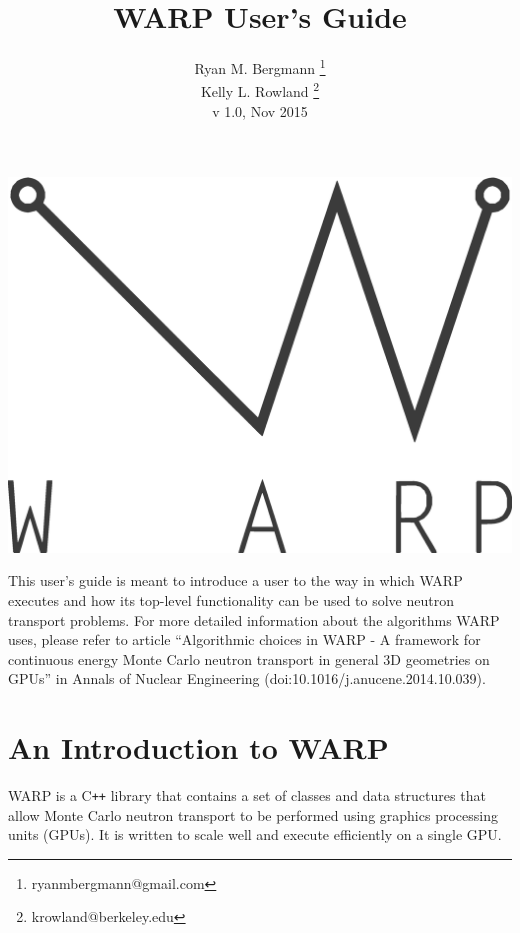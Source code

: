 \documentclass[twoside,a4paper]{refart}
\title{WARP User's Guide}
\author{Ryan M. Bergmann \thanks{ryanmbergmann@gmail.com} \\
Kelly L. Rowland \thanks{krowland@berkeley.edu}\\
v 1.0,  Nov 2015}
\date{}
\begin{document}
\maketitle

%
%

\includegraphics[width=\linewidth]{graphics/warp-vec.eps}

\vspace*{\fill} %

This user's guide is meant to introduce a user to the way in which WARP executes and how its top-level 
functionality can be used to solve neutron transport problems.  For more detailed information about the 
algorithms WARP uses, please refer to article ``Algorithmic choices in WARP - A framework for continuous 
energy Monte Carlo neutron transport in general 3D geometries on GPUs'' in Annals of Nuclear Engineering 
(doi:10.1016/j.anucene.2014.10.039).

\vfill


\newpage
\tableofcontents
\newpage



\section{An Introduction to WARP}

WARP is a C\texttt{++} library that contains a set of classes and data structures that allow Monte Carlo 
neutron transport to be performed using graphics processing units (GPUs).  It is written to scale well and
execute efficiently on a single GPU.
\end{document}
